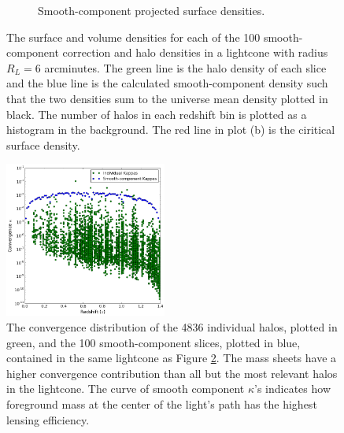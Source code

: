 \documentclass[%
 reprint,
 amsmath,amssymb,
 aps,nofootinbib
]{revtex4-1}
\begin{document}
\begin{figure}
\begin{subfigure}[H]{0.48\textwidth}
        \caption{Smooth-component projected surface densities.}
        \label{fig:surface_densities}
    \end{subfigure}
    \captionsetup{justification=raggedright,singlelinecheck=false}
    \caption{The surface and volume densities for each of the 100 smooth-component correction and halo densities in a lightcone with radius $R_L=6$ arcminutes. The green line is the halo density of each slice and the blue line is the calculated smooth-component density such that the two densities sum to the universe mean density plotted in black. The number of halos in each redshift bin is plotted as a histogram in the background. The red line in plot (b) is the ciritical surface density.}
    \label{densities}
\end{figure}

\begin{figure}
    \centering
    \includegraphics[width=0.475\textwidth]{figs-swe/thesis/kappa_distribution.png}
    \captionsetup{justification=raggedright,singlelinecheck=false}
    \caption{The convergence distribution of the 4836 individual halos, plotted in green, and the 100 smooth-component slices, plotted in blue, contained in the same lightcone as Figure \ref{densities}. The mass sheets have a higher convergence contribution than all but the most relevant halos in the lightcone. The curve of smooth component $\kappa$'s indicates how foreground mass at the center of the light's path has the highest lensing efficiency.}
    \label{fig:kappa_dist}
\end{figure}
\end{document}
